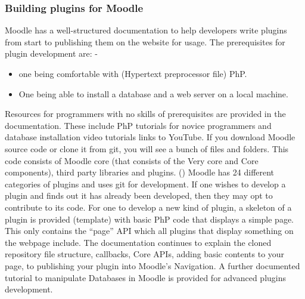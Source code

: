 \documentclass[12pt]{article}
\begin{document}
		\subsubsection{Building plugins for Moodle}
		Moodle has a well-structured documentation to help developers write plugins from start to publishing them on the 			website for usage. The prerequisites for plugin development are: -
		\begin{itemize}
			\item	one being comfortable with (Hypertext preprocessor file) PhP.
			\item  One being able to install a database and a web server on a local machine.
		\end{itemize}
		 Resources for programmers with no skills of prerequisites are provided in the documentation. These include PhP 				tutorials for novice programmers and database installation video tutorials links to YouTube.
		 If you download Moodle source code or clone it from git, you will see a bunch of files and folders. This code 				consists of Moodle core (that consists of the Very core and Core components), third party libraries and plugins. () 			Moodle has 24 different categories of plugins and uses git for development. If one wishes to develop a plugin and 			finds out it has already been developed, then they may opt to contribute to its code. For one to develop a new kind 		of plugin, a skeleton of a plugin is provided (template) with basic PhP code that displays a simple page. This only 				contains the “page” API which all plugins that display something on the webpage include. The documentation 				continues to explain the cloned repository file structure, callbacks, Core APIs, adding basic contents to your page, 			to publishing your plugin into Moodle’s Navigation. A further documented tutorial to manipulate Databases in Moodle 		is provided for advanced plugins development.
\end{document}

